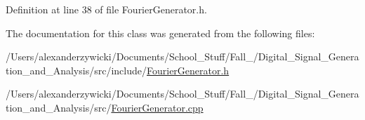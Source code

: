 Definition at line 38 of file Fourier\+Generator.\+h.



The documentation for this class was generated from the following files\+:\begin{DoxyCompactItemize}
\item 
/\+Users/alexanderzywicki/\+Documents/\+School\+\_\+\+Stuff/\+Fall\+\_/\+Digital\+\_\+\+Signal\+\_\+\+Generation\+\_\+and\+\_\+\+Analysis/src/include/\hyperlink{FourierGenerator_8h}{Fourier\+Generator.\+h}\item 
/\+Users/alexanderzywicki/\+Documents/\+School\+\_\+\+Stuff/\+Fall\+\_/\+Digital\+\_\+\+Signal\+\_\+\+Generation\+\_\+and\+\_\+\+Analysis/src/\hyperlink{FourierGenerator_8cpp}{Fourier\+Generator.\+cpp}\end{DoxyCompactItemize}
